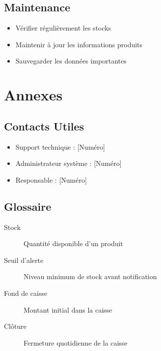 \documentclass[14pt,a4paper]{report}
\begin{document}
\section{Maintenance}
\begin{itemize}
    \item Vérifier régulièrement les stocks
    \item Maintenir à jour les informations produits
    \item Sauvegarder les données importantes
\end{itemize}

\chapter{Annexes}

\section{Contacts Utiles}
\begin{itemize}
    \item Support technique : [Numéro]
    \item Administrateur système : [Numéro]
    \item Responsable : [Numéro]
\end{itemize}

\section{Glossaire}
\begin{description}
    \item[Stock] Quantité disponible d'un produit
    \item[Seuil d'alerte] Niveau minimum de stock avant notification
    \item[Fond de caisse] Montant initial dans la caisse
    \item[Clôture] Fermeture quotidienne de la caisse
\end{description}
\end{document}
